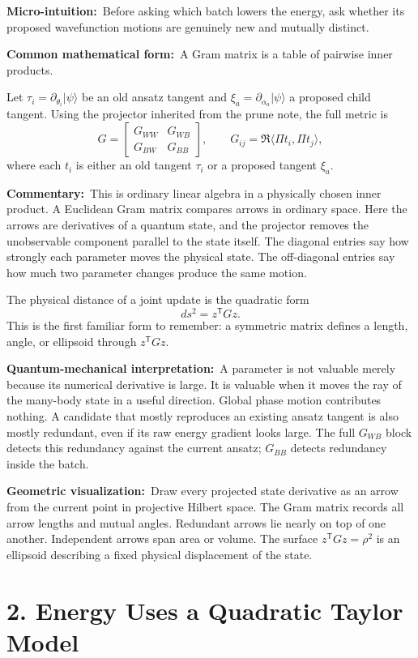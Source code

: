 \documentclass[10pt,twocolumn]{article}
\newcommand{\ket}[1]{|#1\rangle}
\newcommand{\micro}[1]{\par\noindent\textbf{Micro-intuition:}\ #1\par}
\newcommand{\form}[1]{\par\noindent\textbf{Common mathematical form:}\ #1\par}
\newcommand{\commentary}[1]{\par\noindent\textbf{Commentary:}\ #1\par}
\newcommand{\phys}[1]{\par\noindent\textbf{Quantum-mechanical interpretation:}\ #1\par}
\newcommand{\geom}[1]{\par\noindent\textbf{Geometric visualization:}\ \textcolor{teal!70!black}{#1}\par}
\begin{document}
\micro{Before asking which batch lowers the energy, ask whether its proposed
wavefunction motions are genuinely new and mutually distinct.}

\form{A Gram matrix is a table of pairwise inner products.}

Let \(\tau_i=\partial_{\theta_i}\ket{\psi}\) be an old ansatz tangent and
\(\xi_a=\partial_{\alpha_a}\ket{\psi}\) a proposed child tangent. Using the
projector inherited from the prune note, the full metric is
\[
G=
\begin{bmatrix}
G_{WW}&G_{WB}\\
G_{BW}&G_{BB}
\end{bmatrix},
\qquad
G_{ij}=\Re\langle\Pi t_i,\Pi t_j\rangle,
\]
where each \(t_i\) is either an old tangent \(\tau_i\) or a proposed tangent
\(\xi_a\).

\commentary{This is ordinary linear algebra in a physically chosen inner
product. A Euclidean Gram matrix compares arrows in ordinary space. Here the
arrows are derivatives of a quantum state, and the projector removes the
unobservable component parallel to the state itself. The diagonal entries say
how strongly each parameter moves the physical state. The off-diagonal entries
say how much two parameter changes produce the same motion.}

The physical distance of a joint update is the quadratic form
\[
ds^2=z^{\mathsf T}Gz.
\]
This is the first familiar form to remember: a symmetric matrix defines a
length, angle, or ellipsoid through \(z^{\mathsf T}Gz\).

\phys{A parameter is not valuable merely because its numerical derivative is
large. It is valuable when it moves the ray of the many-body state in a useful
direction. Global phase motion contributes nothing. A candidate that mostly
reproduces an existing ansatz tangent is also mostly redundant, even if its raw
energy gradient looks large. The full \(G_{WB}\) block detects this redundancy
against the current ansatz; \(G_{BB}\) detects redundancy inside the batch.}

\geom{Draw every projected state derivative as an arrow from the current point
in projective Hilbert space. The Gram matrix records all arrow lengths and
mutual angles. Redundant arrows lie nearly on top of one another. Independent
arrows span area or volume. The surface \(z^{\mathsf T}Gz=\rho^2\) is an
ellipsoid describing a fixed physical displacement of the state.}

\section*{2. Energy Uses a Quadratic Taylor Model}
\end{document}

